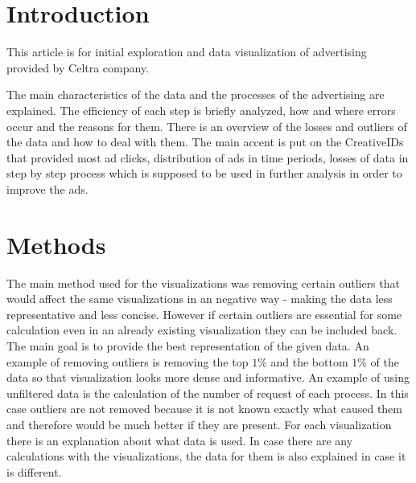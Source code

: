 \documentclass[fleqn,moreauthors,10pt]{ds_report}
\affiliation{\textsuperscript{1}\textit{kt1451@student.uni-lj.si, 63200456}}
\begin{document}
\flushbottom

\maketitle

\thispagestyle{empty}


\section*{Introduction}
	
	This article is for initial exploration and data  visualization of advertising provided by Celtra company.
	
	The main characteristics of the data and the processes of the advertising are explained. The efficiency of each step is briefly analyzed, how and where errors occur and the reasons for them. There is an overview of the losses and outliers of the data and how to deal with them. The main accent is put on the CreativeIDs that provided most ad clicks, distribution of ads in time periods, losses of data in step by step process which is supposed to be used in further analysis in order to improve the ads. 
	  


\section*{Methods}

The main method used for the visualizations was removing certain outliers that would affect the same visualizations in an negative way - making the data less representative and less concise. However if certain outliers are essential for some calculation even in an already existing visualization they can be included back. The main goal is to provide the best representation of the given data. An example of removing outliers is removing the top $1\%$ and the bottom $1\%$ of the data so that visualization looks more dense and informative. An example of using unfiltered data is the calculation of the number of request of each process. In this case outliers are not removed because it is not known exactly what caused them and therefore would be much better if they are present. For each visualization there is an explanation about what data is used. In case there are any calculations with the visualizations, the data for them is also explained in case it is different.
\end{document}
